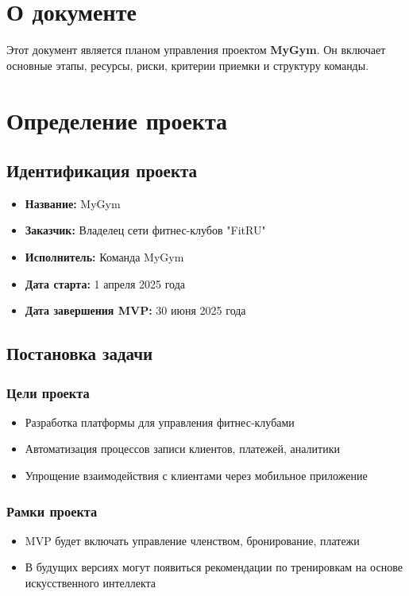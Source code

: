 \documentclass[14pt, russian]{matmex-diploma-custom}
\begin{document}

\maketitle
\section{О документе}
Этот документ является планом управления проектом \textbf{MyGym}. Он включает основные этапы, ресурсы, риски, критерии приемки и структуру команды.

\section{Определение проекта}
\subsection{Идентификация проекта}
\begin{itemize}
\item \textbf{Название:} MyGym
\item \textbf{Заказчик:} Владелец сети фитнес-клубов "FitRU"
\item \textbf{Исполнитель:} Команда MyGym
\item \textbf{Дата старта:} 1 апреля 2025 года
\item \textbf{Дата завершения MVP:} 30 июня 2025 года
\end{itemize}

\subsection{Постановка задачи}
\subsubsection{Цели проекта}
\begin{itemize}
\item Разработка платформы для управления фитнес-клубами
\item Автоматизация процессов записи клиентов, платежей, аналитики
\item Упрощение взаимодействия с клиентами через мобильное приложение
\end{itemize}

\subsubsection{Рамки проекта}
\begin{itemize}
\item MVP будет включать управление членством, бронирование, платежи
\item В будущих версиях могут появиться рекомендации по тренировкам на основе искусственного интеллекта
\end{itemize}
\end{document}

